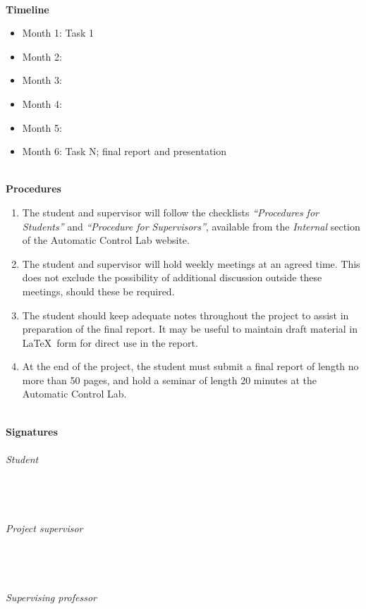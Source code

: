 \documentclass[a4wide]{article}
\begin{document}
\vspace{0.5cm} \noindent \hrulefill \\[0.3cm]
\textbf{Timeline} \\
\begin{itemize}
\item Month 1: Task 1
\item Month 2: 
\item Month 3: 
\item Month 4: 
\item Month 5: 
\item Month 6: Task N; final report and presentation
\end{itemize}

\vspace{0.5cm} \noindent \hrulefill \\[0.3cm]
\textbf{Procedures} \\[0.2cm] \noindent
\begin{enumerate}
\item The student and supervisor will follow the checklists \textit{``Procedures for Students''} and \textit{``Procedure for Supervisors''}, available from the \textit{Internal} section of the Automatic Control Lab website.
\item The student and supervisor will hold weekly meetings at an agreed time. This does not exclude the possibility of additional discussion outside these meetings, should these be required.
\item The student should keep adequate notes throughout the project to assist in preparation of the final report. It may be useful to maintain draft material in \LaTeX ~form for direct use in the report.
\item At the end of the project, the student must submit a final report of length no more than 50 pages, and hold a seminar of length 20 minutes at the Automatic Control Lab.
\end{enumerate}

\vspace{0.5cm} \noindent \hrulefill \\[0.3cm]
\textbf{Signatures} \\[0.2cm] \noindent
\\
{\small \textit{Student}}\\
\\
\\
\\
\\
{\small \textit{Project supervisor}}\\
\\
\\
\\
\\
{\small \textit{Supervising professor}}\\
\\
\end{document}
